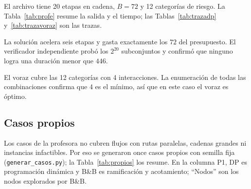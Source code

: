 \documentclass[11pt,a4paper]{article}
\theoremstyle{definition}
\begin{document}
El archivo \NombreCasoProfe{} tiene 20 etapas en cadena, $B=72$ y 12 categorías de riesgo. La Tabla~\ref{tab:profe} resume la salida y el tiempo; las Tablas~\ref{tab:trazadp} y~\ref{tab:trazavoraz} son las trazas.

\begin{table}[ht]
\centering
\small
\TablaProfe
\caption{Salida y tiempo de la solución base sobre el caso de la profesora.}
\label{tab:profe}
\end{table}

\begin{table}[ht]
\centering
\small
\TablaTrazaDP
\caption{Traza de la reconstrucción del DP en el caso de la profesora, de la última etapa a la primera. La columna $b$ antes es el presupuesto que queda al llegar a la etapa; $DP[i][b]$ es el ahorro óptimo con las etapas hasta esa y ese presupuesto. La tabla completa de $21\times 73$ celdas está en \texttt{parte1\_traza.json}.}
\label{tab:trazadp}
\end{table}

La solución acelera seis etapas y gasta exactamente los $72$ del presupuesto. El verificador independiente probó los $2^{20}$ subconjuntos y confirmó que ninguno logra una duración menor que $446$.

\begin{table}[ht]
\centering
\small
\TablaTrazaVoraz
\caption{Traza del voraz en el caso de la profesora: orden de elección, categorías nuevas por vuelta y cobertura acumulada de las $r=12$ categorías.}
\label{tab:trazavoraz}
\end{table}

El voraz cubre las 12 categorías con 4 interacciones. La enumeración de todas las combinaciones confirma que 4 es el mínimo, así que en este caso el voraz es óptimo.

\subsection{Casos propios}

Los casos de la profesora no cubren flujos con rutas paralelas, cadenas grandes ni instancias infactibles. Por eso se generaron once casos propios con semilla fija (\texttt{generar\_casos.py}); la Tabla~\ref{tab:propios} los resume. En la columna P1, DP es programación dinámica y B\&B es ramificación y acotamiento; ``Nodos'' son los nodos explorados por B\&B.

\begin{table}[ht]
\centering
\scriptsize
\setlength{\tabcolsep}{3pt}
\TablaPropios
\caption{Casos propios (tiempos: mediana de 5 repeticiones). Todos pasan los verificadores independientes. El caso \texttt{08\_infactible} deja una categoría sin cubrir y la Parte 2 lo reporta como infactible, nombrando la categoría.}
\label{tab:propios}
\end{table}
\end{document}
